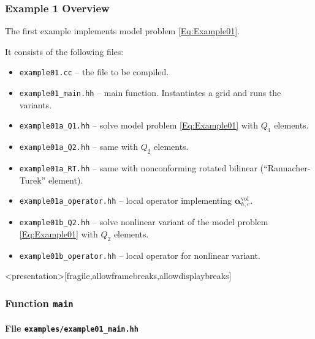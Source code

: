 \begin{frame}
\frametitle{Example 1 Overview}
The first example implements model problem \eqref{Eq:Example01}.

It consists of the following files:
\begin{itemize}
\item \lstinline{example01.cc} -- the file to be compiled. 
\item \lstinline{example01_main.hh} -- main function. Instantiates a grid and runs the variants.
\item \lstinline{example01a_Q1.hh} -- solve model problem \eqref{Eq:Example01} with $Q_1$ elements.
\item \lstinline{example01a_Q2.hh} -- same with $Q_2$ elements.
\item \lstinline{example01a_RT.hh} -- same with nonconforming rotated bilinear (``Rannacher-Turek'' element).
\item \lstinline{example01a_operator.hh} -- local operator implementing $\bm{\alpha}_{h,e}^{\text{vol}}$.
\item \lstinline{example01b_Q2.hh} -- solve nonlinear variant of the model problem \eqref{Eq:Example01} with $Q_2$ elements.
\item \lstinline{example01b_operator.hh} -- local operator for nonlinear variant.
\end{itemize}
\end{frame}

\begin{frame}<presentation>[fragile,allowframebreaks,allowdisplaybreaks]
\frametitle<presentation>{Function \lstinline{main}}
\framesubtitle<presentation>{File \texttt{examples/example01\_main.hh}}

\end{frame}


